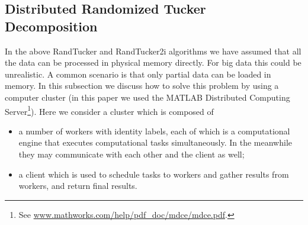 \documentclass[10pt,twocolumn,twoside]{IEEEtran}
\begin{document}
\subsection{Distributed Randomized Tucker Decomposition}
\label{sec:DisTucker}
In the above RandTucker and RandTucker2i algorithms we have assumed that all the data can be processed in physical memory directly. For big data this could be unrealistic. A common scenario is that only partial data can be loaded in memory. In this subsection we discuss how to solve this problem  by using a computer cluster (in this paper we used the MATLAB Distributed Computing Server\footnote{See \url{www.mathworks.com/help/pdf_doc/mdce/mdce.pdf}.}). Here we consider a cluster which is composed of
\begin{itemize}
\item a number of workers with identity labels, each of which is a computational engine that executes computational tasks simultaneously. In the meanwhile they may communicate with each other and  the client as well;

\item a client which is used to schedule tasks to workers and gather results from workers, and return final results.
\end{itemize}
\end{document}
